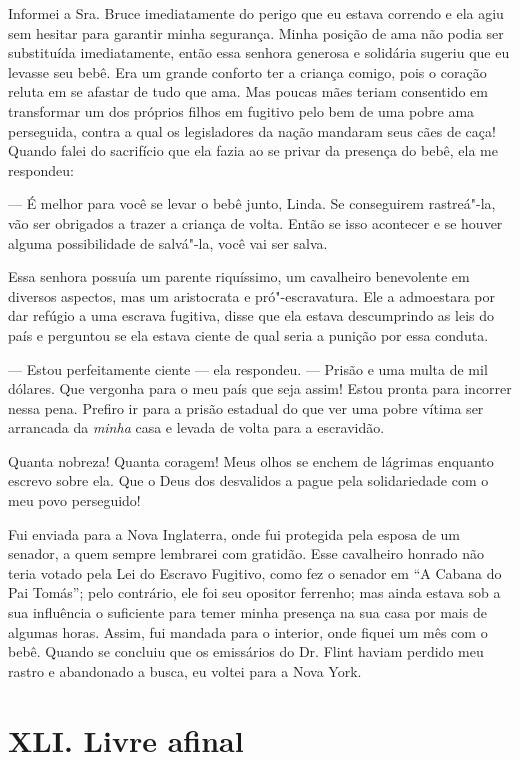 Informei a Sra. Bruce imediatamente do
perigo que eu estava correndo e ela agiu sem hesitar para garantir minha
segurança. Minha posição de ama não podia ser substituída imediatamente,
então essa senhora generosa e solidária sugeriu que eu levasse seu bebê.
Era um grande conforto ter a criança comigo, pois o coração reluta em se
afastar de tudo que ama. Mas poucas mães teriam consentido em
transformar um dos próprios filhos em fugitivo pelo bem de uma pobre ama
perseguida, contra a qual os legisladores da nação mandaram seus cães de
caça! Quando falei do sacrifício que ela fazia ao se privar da presença
do bebê, ela me respondeu:

--- É melhor para você se levar o bebê junto, Linda. Se conseguirem
rastreá"-la, vão ser obrigados a trazer a criança de volta. Então se isso
acontecer e se houver alguma possibilidade de salvá"-la, você vai ser
salva.

Essa senhora possuía um parente
riquíssimo, um cavalheiro benevolente em diversos aspectos, mas um
aristocrata e pró"-escravatura. Ele a admoestara por dar refúgio a uma
escrava fugitiva, disse que ela estava descumprindo as leis do país e
perguntou se ela estava ciente de qual seria a punição por essa conduta.

--- Estou perfeitamente ciente --- ela respondeu. --- Prisão e uma multa
de mil dólares. Que vergonha para o meu país que seja assim! Estou
pronta para incorrer nessa pena. Prefiro ir para a prisão estadual do
que ver uma pobre vítima ser arrancada da \emph{minha} casa e levada de
volta para a escravidão.

Quanta nobreza! Quanta coragem! Meus
olhos se enchem de lágrimas enquanto escrevo sobre ela. Que o Deus dos
desvalidos a pague pela solidariedade com o meu povo perseguido!

Fui enviada para a Nova Inglaterra,
onde fui protegida pela esposa de um senador, a quem sempre lembrarei
com gratidão. Esse cavalheiro honrado não teria votado pela Lei do
Escravo Fugitivo, como fez o senador em ``A Cabana do Pai Tomás''; pelo
contrário, ele foi seu opositor ferrenho; mas ainda estava sob a sua
influência o suficiente para temer minha presença na sua casa por mais
de algumas horas. Assim, fui mandada para o interior, onde fiquei um mês
com o bebê. Quando se concluiu que os emissários do Dr. Flint haviam
perdido meu rastro e abandonado a busca, eu voltei para a Nova York.

\chapter{XLI. Livre afinal}

